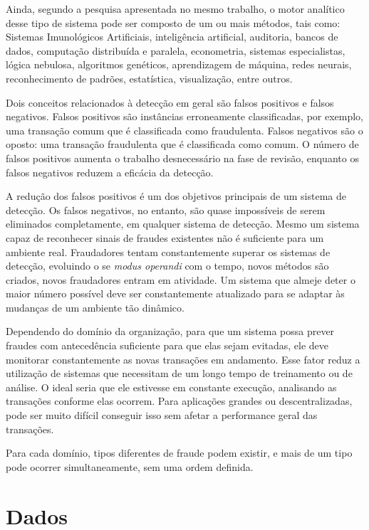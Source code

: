 Ainda, segundo a pesquisa apresentada no mesmo trabalho, o motor analítico desse tipo de sistema pode ser composto de um ou mais métodos, tais como: Sistemas Imunológicos Artificiais, inteligência artificial, auditoria, bancos de dados, computação distribuída e paralela, econometria, sistemas especialistas, lógica nebulosa, algoritmos genéticos, aprendizagem de máquina, redes neurais, reconhecimento de padrões, estatística, visualização, entre outros.

Dois conceitos relacionados à detecção em geral são falsos positivos e falsos negativos. Falsos positivos são instâncias erroneamente classificadas, por exemplo, uma transação comum que é classificada como fraudulenta. Falsos negativos são o oposto: uma transação fraudulenta que é classificada como comum. O número de falsos positivos aumenta o trabalho desnecessário na fase de revisão, enquanto os falsos negativos reduzem a eficácia da detecção.

A redução dos falsos positivos é um dos objetivos principais de um sistema de detecção. Os falsos negativos, no entanto, são quase impossíveis de serem eliminados completamente, em qualquer sistema de detecção. Mesmo um sistema capaz de reconhecer sinais de fraudes existentes não é suficiente para um ambiente real. Fraudadores tentam constantemente superar os sistemas de detecção, evoluindo o se \emph{modus operandi} com o tempo, novos métodos são criados, novos fraudadores entram em atividade. Um sistema que almeje deter o maior número possível deve ser constantemente atualizado para se adaptar às mudanças de um ambiente tão dinâmico.

Dependendo do domínio da organização, para que um sistema possa prever fraudes com antecedência suficiente para que elas sejam evitadas, ele deve monitorar constantemente as novas transações em andamento. Esse fator reduz a utilização de sistemas que necessitam de um longo tempo de treinamento ou de análise. O ideal seria que ele estivesse em constante execução, analisando as transações conforme elas ocorrem. Para aplicações grandes ou descentralizadas, pode ser muito difícil conseguir isso sem afetar a performance geral das transações.

Para cada domínio, tipos diferentes de fraude podem existir, e mais de um tipo pode ocorrer simultaneamente, sem uma ordem definida. 

\section{Dados}

